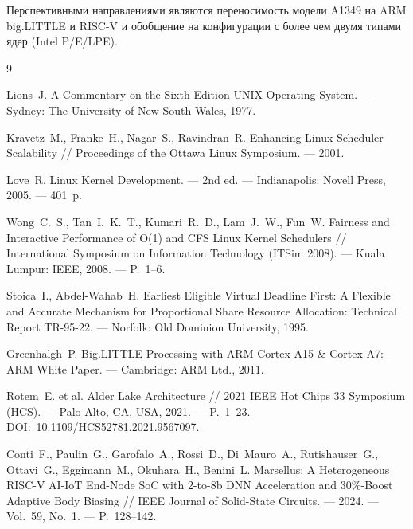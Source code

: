 \documentclass[14pt, oneside]{extbook}
\begin{document}
        Перспективными направлениями являются переносимость
        модели A1349 на ARM big.LITTLE и RISC-V и обобщение
        на конфигурации с более чем двумя типами ядер
        (Intel P/E/LPE).


\renewcommand{\bibname}{Список литературы}
\begin{thebibliography}{9}
        \vspace*{0.3cm}

        Lions~J. A Commentary on the Sixth Edition UNIX Operating
        System. --- Sydney: The University of New South Wales, 1977.

        Kravetz~M., Franke~H., Nagar~S., Ravindran~R. Enhancing Linux
        Scheduler Scalability // Proceedings of the Ottawa Linux
        Symposium. --- 2001.

        Love~R. Linux Kernel Development. --- 2nd ed. --- Indianapolis:
        Novell Press, 2005. --- 401~p.

        Wong~C.~S., Tan~I.~K.~T., Kumari~R.~D., Lam~J.~W., Fun~W.
        Fairness and Interactive Performance of O(1) and CFS Linux
        Kernel Schedulers // International Symposium on Information
        Technology (ITSim 2008). --- Kuala Lumpur: IEEE, 2008. ---
        P.~1--6.

        Stoica~I., Abdel-Wahab~H. Earliest Eligible Virtual Deadline
        First: A Flexible and Accurate Mechanism for Proportional Share
        Resource Allocation: Technical Report TR-95-22. --- Norfolk:
        Old Dominion University, 1995.

        Greenhalgh~P. Big.LITTLE Processing with ARM Cortex-A15 \&
        Cortex-A7: ARM White Paper. --- Cambridge: ARM Ltd., 2011.

        Rotem~E. et al. Alder Lake Architecture // 2021 IEEE Hot Chips
        33 Symposium (HCS). --- Palo Alto, CA, USA, 2021. ---
        P.~1--23. --- DOI:~10.1109/HCS52781.2021.9567097.

        Conti~F., Paulin~G., Garofalo~A., Rossi~D., Di~Mauro~A.,
        Rutishauser~G., Ottavi~G., Eggimann~M., Okuhara~H., Benini~L.
        Marsellus: A Heterogeneous RISC-V AI-IoT End-Node SoC with
        2-to-8b DNN Acceleration and 30\%-Boost Adaptive Body
        Biasing // IEEE Journal of Solid-State Circuits. --- 2024. ---
        Vol.~59, No.~1. --- P.~128--142.


\end{thebibliography}
\end{document}
